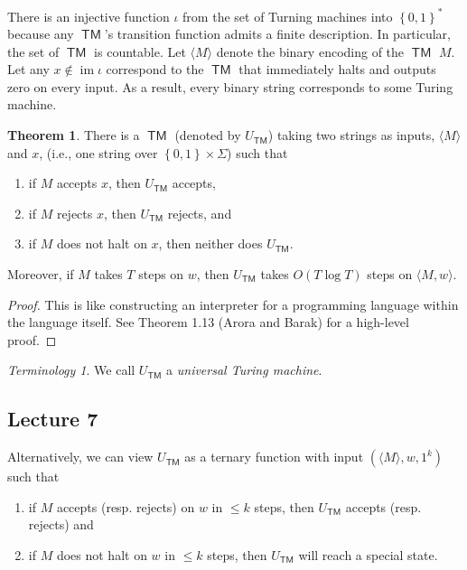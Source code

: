 \documentclass[10pt,letterpaper,cm]{nupset}
\theoremstyle{definition}
\theoremstyle{theorem}
\newtheorem{theorem}[definition]{Theorem}
\theoremstyle{remark}
\newtheorem*{term}{Terminology}
\newcommand{\1}{\mathbf{1}}
\newcommand{\0}{\vec 0}
\DeclareMathOperator{\im}{im}
\DeclareMathOperator{\TM}{\mathsf{TM}}
\begin{document}
\medskip

There is an injective function $\iota$ from the set of Turning machines into $\left\{0,1\right\}^{\ast}$ because any $\TM$'s transition function admits a finite description. In particular, the set of $\TM$ is countable. Let $\langle M \rangle $ denote the binary encoding of the $\TM$ $M$. Let any $x\notin \im{\iota}$ correspond to the $\TM$ that immediately halts and outputs zero on every input. As a result, every binary string corresponds to some Turing machine. 

\smallskip

\begin{theorem}
 There is a $\TM$ (denoted by $U_{\TM}$) taking two strings as inputs, $\langle M \rangle$ and $x$, (i.e., one string over $\left\{0,1\right\} \times \Sigma$) such that
 \begin{enumerate}[label=(\alph*)]
 \item if $M$ accepts $x$, then $U_{\TM}$ accepts,
 \item if $M$ rejects $x$, then $U_{\TM}$ rejects, and
 \item if $M$ does not halt on $x$, then neither does $U_{\TM}$.
 \end{enumerate} Moreover, if $M$ takes $T$ steps on $w$, then $U_{\TM}$ takes $O(T \log{T})$ steps on $\langle M, w \rangle$.
\end{theorem}
\begin{proof}
This is like constructing an interpreter for a programming language within the language itself. See Theorem 1.13 (Arora and Barak) for a high-level proof.
\end{proof}

\begin{term}
We call $U_{\TM}$ a \textit{universal Turing machine}.
\end{term}

\subsection{Lecture 7}


Alternatively, we can view $U_{\TM}$ as a ternary function with input $\left(\langle M \rangle,  w, 1^k\right)$ such that
\begin{enumerate}[label=(\roman*)]
\item if $M$ accepts (resp. rejects) on $w$ in $\leq k$ steps, then $U_{\TM}$ accepts (resp. rejects) and
\item if $M$ does not halt on $w$ in $\leq k$ steps, then $U_{\TM}$ will reach a special state.
\end{enumerate}
\end{document}

